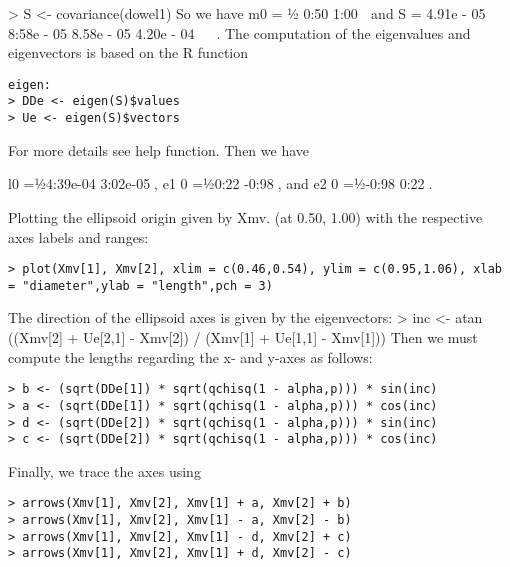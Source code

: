 \documentclass[a4paper,12pt]{article}
\begin{document}
> S <- covariance(dowel1)
So we have
m0 = ½ 0:50 1:00  and S = 4.91e - 05 8:58e - 05
8.58e - 05 4.20e - 04
 
.
The computation of the eigenvalues and eigenvectors is based on the R function
\begin{verbatim}
eigen:
> DDe <- eigen(S)$values
> Ue <- eigen(S)$vectors
\end{verbatim}

For more details see help function.
Then we have

l0 =½4:39e-04 3:02e-05, e1
0 =½0:22 -0:98, and e2
0 =½-0:98 0:22.

Plotting the ellipsoid origin given by Xmv. (at 0.50, 1.00) with the respective
axes labels and ranges:
\begin{framed}
\begin{verbatim}
> plot(Xmv[1], Xmv[2], xlim = c(0.46,0.54), ylim = c(0.95,1.06), xlab = "diameter",ylab = "length",pch = 3)
\end{verbatim}
\end{framed}
The direction of the ellipsoid axes is given by the eigenvectors:
> inc <- atan ((Xmv[2] + Ue[2,1] - Xmv[2]) / (Xmv[1] + Ue[1,1] - Xmv[1]))
Then we must compute the lengths regarding the x- and y-axes as follows:
\begin{framed}
\begin{verbatim}
> b <- (sqrt(DDe[1]) * sqrt(qchisq(1 - alpha,p))) * sin(inc)
> a <- (sqrt(DDe[1]) * sqrt(qchisq(1 - alpha,p))) * cos(inc)
> d <- (sqrt(DDe[2]) * sqrt(qchisq(1 - alpha,p))) * sin(inc)
> c <- (sqrt(DDe[2]) * sqrt(qchisq(1 - alpha,p))) * cos(inc)
\end{verbatim}
\end{framed}
Finally, we trace the axes using
\begin{framed}
\begin{verbatim}
> arrows(Xmv[1], Xmv[2], Xmv[1] + a, Xmv[2] + b)
> arrows(Xmv[1], Xmv[2], Xmv[1] - a, Xmv[2] - b)
> arrows(Xmv[1], Xmv[2], Xmv[1] - d, Xmv[2] + c)
> arrows(Xmv[1], Xmv[2], Xmv[1] + d, Xmv[2] - c)
\end{verbatim}
\end{framed}
\end{document}
